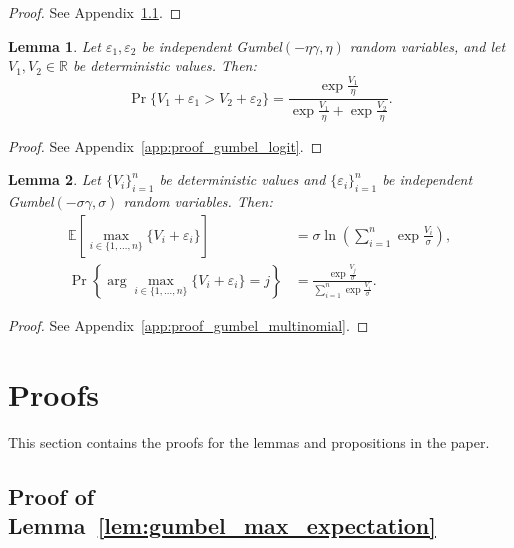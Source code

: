 \documentclass[12pt]{article}
\theoremstyle{plain}
\newtheorem{lemma}{Lemma}
\begin{document}
\begin{proof}
	See Appendix~\ref{app:proof_gumbel_max_expectation}.
\end{proof}

\begin{lemma}
	\label{lem:gumbel_logit}
	Let $\varepsilon_1, \varepsilon_2$ be independent Gumbel$(-\eta\gamma, \eta)$ random variables, and let $V_1, V_2 \in \mathbb{R}$ be deterministic values. Then:
	\begin{equation}
		\Pr\{V_1 + \varepsilon_1 > V_2 + \varepsilon_2\} = \frac{\exp\frac{V_1}{\eta}}{\exp\frac{V_1}{\eta} + \exp\frac{V_2}{\eta}}.
	\end{equation}
\end{lemma}

\begin{proof}
	See Appendix~\ref{app:proof_gumbel_logit}.
\end{proof}

\begin{lemma}
	\label{lem:gumbel_multinomial}
	Let $\{V_i\}_{i=1}^n$ be deterministic values and $\{\varepsilon_i\}_{i=1}^n$ be independent Gumbel$(-\sigma\gamma, \sigma)$ random variables. Then:
	\begin{align}
		\mathbb{E}\left[\max_{i \in \{1,\ldots,n\}} \{V_i + \varepsilon_i\}\right]    & = \sigma \ln\left( \sum_{i=1}^n \exp\frac{V_i}{\sigma} \right),       \\
		\Pr\left\{\arg\max_{i \in \{1,\ldots,n\}} \{V_i + \varepsilon_i\} = j\right\} & = \frac{\exp\frac{V_j}{\sigma}}{\sum_{i=1}^n \exp\frac{V_i}{\sigma}}.
	\end{align}
\end{lemma}

\begin{proof}
	See Appendix~\ref{app:proof_gumbel_multinomial}.
\end{proof}

\section{Proofs}\label{app:proofs}
This section contains the proofs for the lemmas and propositions in the paper.

\subsection{Proof of Lemma~\ref{lem:gumbel_max_expectation}}\label{app:proof_gumbel_max_expectation}
\end{document}
